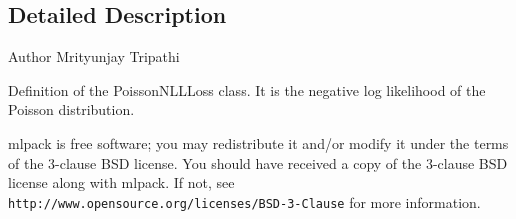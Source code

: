 \subsection{Detailed Description}
\begin{DoxyAuthor}{Author}
Mrityunjay Tripathi
\end{DoxyAuthor}
Definition of the Poisson\+N\+L\+L\+Loss class. It is the negative log likelihood of the Poisson distribution.

mlpack is free software; you may redistribute it and/or modify it under the terms of the 3-\/clause B\+SD license. You should have received a copy of the 3-\/clause B\+SD license along with mlpack. If not, see {\tt http\+://www.\+opensource.\+org/licenses/\+B\+S\+D-\/3-\/\+Clause} for more information. 